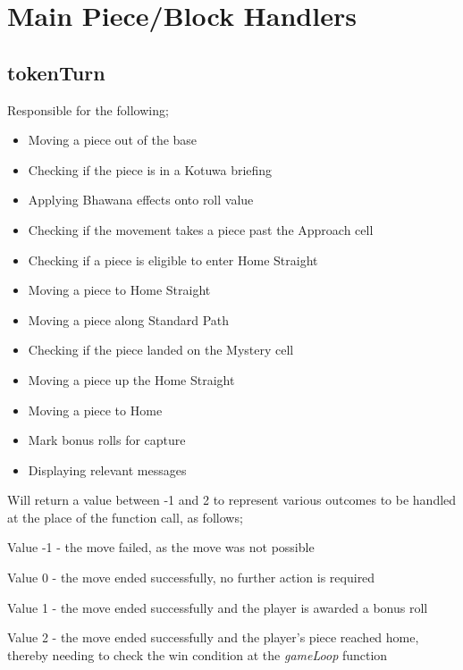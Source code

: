\documentclass{article}
\begin{document}
\section{Main Piece/Block Handlers}
\subsection{tokenTurn}
Responsible for the following;
\begin{itemize}
    \item Moving a piece out of the base
    \item Checking if the piece is in a Kotuwa briefing
    \item Applying Bhawana effects onto roll value
    \item Checking if the movement takes a piece past the Approach cell
    \item Checking if a piece is eligible to enter Home Straight
    \item Moving a piece to Home Straight
    \item Moving a piece along Standard Path
    \item Checking if the piece landed on the Mystery cell
    \item Moving a piece up the Home Straight
    \item Moving a piece to Home
    \item Mark bonus rolls for capture
    \item Displaying relevant messages
\end{itemize}

Will return a value between -1 and 2 to represent various outcomes to be handled at the place of the function call, as follows;

Value -1 - the move failed, as the move was not possible

Value 0 - the move ended successfully, no further action is required

Value 1 - the move ended successfully and the player is awarded a bonus roll

Value 2 - the move ended successfully and the player's piece reached home, thereby needing to check the win condition at the \textit{gameLoop} function
\end{document}
